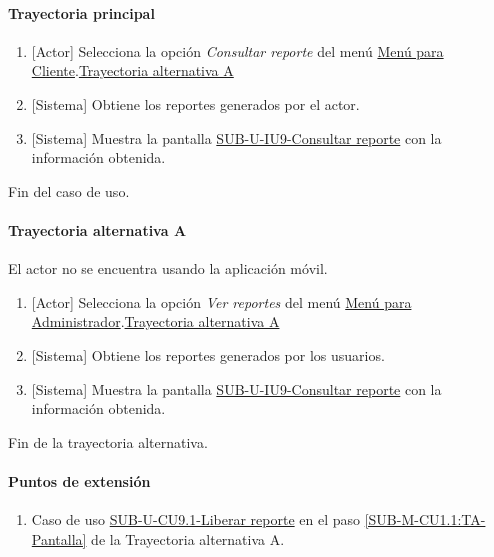 \paragraph{Trayectoria principal}
	\begin{enumerate}
		\item {[Actor]} Selecciona la opción \textit{Consultar reporte} del menú \hyperref[fig:menu-cliente]{Menú para Cliente}.\hyperref[SUB-U-CU9:TA]{Trayectoria alternativa A}
		\item {[Sistema]} Obtiene los reportes generados por el actor.
		\item {[Sistema]} Muestra la pantalla \hyperref[fig:sub-u-iu9]{SUB-U-IU9-Consultar reporte} con la información obtenida.
	\end{enumerate}
	Fin del caso de uso.

\paragraph{Trayectoria alternativa A} \label{SUB-U-CU9:TA}
	El actor no se encuentra usando la aplicación móvil.
	\begin{enumerate}[label=A\arabic*.]
		\item {[Actor]} Selecciona la opción \textit{Ver reportes} del menú \hyperref[fig:menu-cliente]{Menú para Administrador}.\hyperref[SUB-U-CU9:TA]{Trayectoria alternativa A}
		\item {[Sistema]} Obtiene los reportes generados por los usuarios.
		\item \label{SUB-M-CU1.1:TA-Pantalla} {[Sistema]} Muestra la pantalla \hyperref[fig:sub-u-iu9]{SUB-U-IU9-Consultar reporte} con la información obtenida.
	\end{enumerate}
	Fin de la trayectoria alternativa.

\paragraph{Puntos de extensión} \label{SUB-U-CU9:PE}
\begin{enumerate}[label=PE\arabic*.]
	\item Caso de uso \hyperref[SUB-9-CU9.11]{SUB-U-CU9.1-Liberar reporte} en el paso \ref{SUB-M-CU1.1:TA-Pantalla} de la Trayectoria alternativa A.
\end{enumerate}
